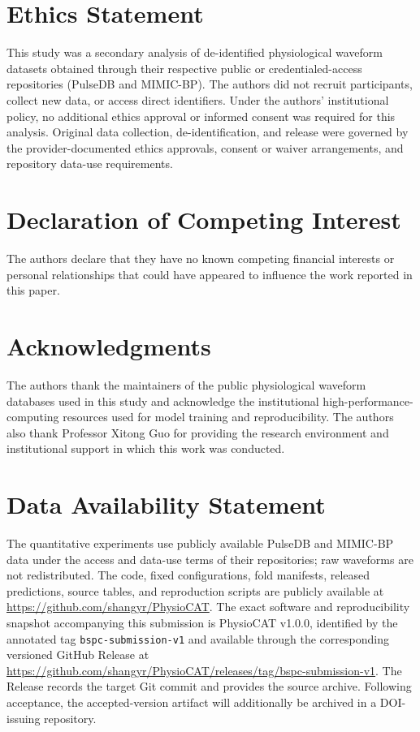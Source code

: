 \documentclass[preprint,12pt]{elsarticle}
\begin{document}
\section*{Ethics Statement}

This study was a secondary analysis of de-identified physiological waveform datasets obtained through their respective public or credentialed-access repositories (PulseDB and MIMIC-BP). The authors did not recruit participants, collect new data, or access direct identifiers. Under the authors' institutional policy, no additional ethics approval or informed consent was required for this analysis. Original data collection, de-identification, and release were governed by the provider-documented ethics approvals, consent or waiver arrangements, and repository data-use requirements.

\section*{Declaration of Competing Interest}

The authors declare that they have no known competing financial interests or personal relationships that could have appeared to influence the work reported in this paper.

\section*{Acknowledgments}

The authors thank the maintainers of the public physiological waveform databases used in this study and acknowledge the institutional high-performance-computing resources used for model training and reproducibility. The authors also thank Professor Xitong Guo for providing the research environment and institutional support in which this work was conducted.

\section*{Data Availability Statement}

The quantitative experiments use publicly available PulseDB and MIMIC-BP data under the access and data-use terms of their repositories; raw waveforms are not redistributed. The code, fixed configurations, fold manifests, released predictions, source tables, and reproduction scripts are publicly available at \url{https://github.com/shangyr/PhysioCAT}. The exact software and reproducibility snapshot accompanying this submission is PhysioCAT v1.0.0, identified by the annotated tag \texttt{bspc-submission-v1} and available through the corresponding versioned GitHub Release at \url{https://github.com/shangyr/PhysioCAT/releases/tag/bspc-submission-v1}. The Release records the target Git commit and provides the source archive. Following acceptance, the accepted-version artifact will additionally be archived in a DOI-issuing repository.
\end{document}
